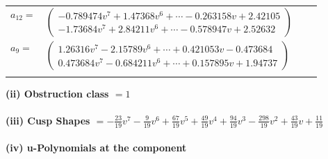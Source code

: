 \documentclass[1p]{elsarticle_modified}
\theoremstyle{definition}
\begin{document}
\begin{tabular}{m{7pt} m{180pt} m{7pt} m{180pt} }
\flushright $a_{12}=$&$\begin{pmatrix}-0.789474 v^{7}+1.47368 v^{6}+\cdots-0.263158 v+2.42105\\-1.73684 v^{7}+2.84211 v^{6}+\cdots-0.578947 v+2.52632\end{pmatrix}$ \\
\flushright $a_{9}=$&$\begin{pmatrix}1.26316 v^{7}-2.15789 v^{6}+\cdots+0.421053 v-0.473684\\0.473684 v^{7}-0.684211 v^{6}+\cdots+0.157895 v+1.94737\end{pmatrix}$\\&\end{tabular}
\flushleft \textbf{(ii) Obstruction class $= 1$}\\~\\
\flushleft \textbf{(iii) Cusp Shapes $= -\frac{23}{19} v^7-\frac{9}{19} v^6+\frac{67}{19} v^5+\frac{49}{19} v^4+\frac{94}{19} v^3-\frac{298}{19} v^2+\frac{43}{19} v+\frac{11}{19}$}\\~\\
\newpage\renewcommand{\arraystretch}{1}
\flushleft \textbf{(iv) u-Polynomials at the component}\newline \\
\end{document}
